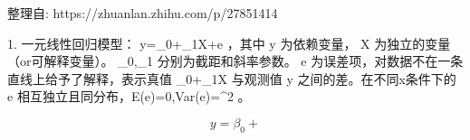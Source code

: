 

整理自: https://zhuanlan.zhihu.com/p/27851414

1. 一元线性回归模型： y=\beta_0+\beta_1X+e ，其中 y 为依赖变量，  X 为独立的变量（or可解释变量）。 \beta_0,\beta_1 分别为截距和斜率参数。 e 为误差项，对数据不在一条直线上给予了解释，表示真值 \beta_0+\beta_1X 与观测值 y 之间的差。在不同x条件下的 e 相互独立且同分布，E(e)=0,Var(e)=\sigma^2 。

\[
y = \beta_0 + 
\]